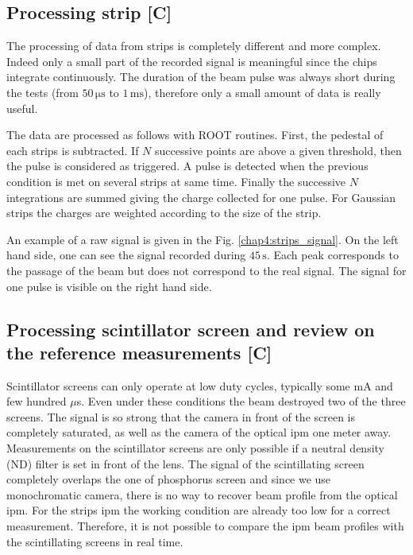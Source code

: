 \begin{refsection}
  

  \subsection{Processing strip [C]}
  The processing of data from strips is completely different and more complex. Indeed only a small part of the recorded signal is meaningful since the chips integrate continuously. The duration of the beam pulse was always short during the tests (from $50\,\mathrm{\mu s}$ to $1\,\mathrm{ms}$), therefore only a small amount of data is really useful.

  The data are processed as follows with ROOT\cite{Brun1997,Antcheva2009} routines. First, the pedestal of each strips is subtracted. If $N$ successive points are above a given threshold, then the pulse is considered as triggered. A pulse is detected when the previous condition is met on several strips at same time. Finally the successive $N$ integrations are summed giving the charge collected for one pulse. For Gaussian strips the charges are weighted according to the size of the strip.

  An example of a raw signal is given in the Fig. \ref{chap4:strips_signal}. On the left hand side, one can see the signal recorded during $45\,\mathrm{s}$. Each peak corresponds to the passage of the beam but does not correspond to the real signal. The signal for one pulse is visible on the right hand side.

  


  \subsection{Processing scintillator screen and review on the reference measurements [C]}
  Scintillator screens can only operate at low duty cycles, typically some mA and few hundred $\mu$s. Even under these conditions the beam destroyed two of the three screens. The signal is so strong that the camera in front of the screen is completely saturated, as well as the camera of the optical \acrshort{ipm} one meter away. Measurements on the scintillator screens are only possible if a neutral density (ND) filter is set in front of the lens. The signal of the scintillating screen completely overlaps the one of phosphorus screen and since we use monochromatic camera, there is no way to recover beam profile from the optical \acrshort{ipm}. For the strips \acrshort{ipm} the working condition are already too low for a correct measurement. Therefore, it is not possible to compare the \acrshort{ipm} beam profiles with the scintillating screens in real time.
  


\end{refsection}
